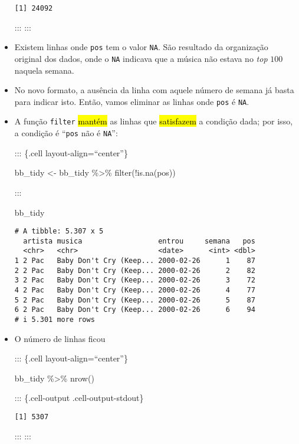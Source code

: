 \documentclass[
  letterpaper,
  DIV=11,
  numbers=noendperiod]{scrreprt}
\newenvironment{Shaded}{\begin{snugshade}}{\end{snugshade}}
\newcommand{\FunctionTok}[1]{\textcolor[rgb]{0.28,0.35,0.67}{#1}}
\newcommand{\NormalTok}[1]{\textcolor[rgb]{0.00,0.23,0.31}{#1}}
\newcommand{\OtherTok}[1]{\textcolor[rgb]{0.00,0.23,0.31}{#1}}
\newcommand{\SpecialCharTok}[1]{\textcolor[rgb]{0.37,0.37,0.37}{#1}}
\begin{document}
\begin{itemize}
\begin{verbatim}
[1] 24092
\end{verbatim}

  ::: :::
\item
  Existem linhas onde \texttt{pos} tem o valor \texttt{NA}. São
  resultado da organização original dos dados, onde o \texttt{NA}
  indicava que a música não estava no \emph{top} $100$ naquela semana.
\item
  No novo formato, a ausência da linha com aquele número de semana já
  basta para indicar isto. Então, vamos eliminar as linhas onde
  \texttt{pos} é \texttt{NA}.
\item
  A função \texttt{filter} {\hl{mantém}} as linhas que {\hl{satisfazem}}
  a condição dada; por isso, a condição é ``\texttt{pos} não é
  \texttt{NA}'':

  ::: \{.cell layout-align=``center''\}

\begin{Shaded}
\begin{Highlighting}[]
\NormalTok{bb\_tidy }\OtherTok{\textless{}{-}}\NormalTok{ bb\_tidy }\SpecialCharTok{\%\textgreater{}\%} 
  \FunctionTok{filter}\NormalTok{(}\SpecialCharTok{!}\FunctionTok{is.na}\NormalTok{(pos))}
\end{Highlighting}
\end{Shaded}

  :::

\begin{Shaded}
\begin{Highlighting}[]
\NormalTok{bb\_tidy}
\end{Highlighting}
\end{Shaded}

\begin{verbatim}
# A tibble: 5.307 x 5
  artista musica                  entrou     semana   pos
  <chr>   <chr>                   <date>      <int> <dbl>
1 2 Pac   Baby Don't Cry (Keep... 2000-02-26      1    87
2 2 Pac   Baby Don't Cry (Keep... 2000-02-26      2    82
3 2 Pac   Baby Don't Cry (Keep... 2000-02-26      3    72
4 2 Pac   Baby Don't Cry (Keep... 2000-02-26      4    77
5 2 Pac   Baby Don't Cry (Keep... 2000-02-26      5    87
6 2 Pac   Baby Don't Cry (Keep... 2000-02-26      6    94
# i 5.301 more rows
\end{verbatim}
\item
  O número de linhas ficou

  ::: \{.cell layout-align=``center''\}

\begin{Shaded}
\begin{Highlighting}[]
\NormalTok{bb\_tidy }\SpecialCharTok{\%\textgreater{}\%} \FunctionTok{nrow}\NormalTok{()}
\end{Highlighting}
\end{Shaded}

  ::: \{.cell-output .cell-output-stdout\}

\begin{verbatim}
[1] 5307
\end{verbatim}

  ::: :::
\end{itemize}
\end{document}
